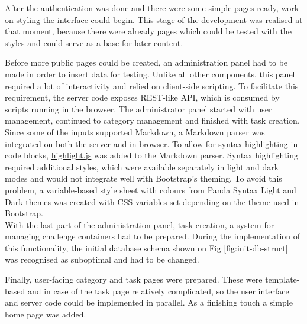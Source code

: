 After the authentication was done and there were some simple pages ready, work on styling the interface could begin. This stage of the development was realised at that moment, because there were already pages which could be tested with the styles and could serve as a base for later content.

Before more public pages could be created, an administration panel had to be made in order to insert data for testing. Unlike all other components, this panel required a lot of interactivity and relied on client-side scripting. To facilitate this requirement, the server code exposes REST-like API, which is consumed by scripts running in the browser. The administrator panel started with user management, continued to category management and finished with task creation.\\
Since some of the inputs supported Markdown, a Markdown parser was integrated on both the server and in browser. To allow for syntax highlighting in code blocks, \href{https://highlightjs.org}{highlight.js} was added to the Markdown parser. Syntax highlighting required additional styles, which were available separately in light and dark modes and would not integrate well with Bootstrap's theming. To avoid this problem, a variable-based style sheet with colours from Panda Syntax Light and Dark themes was created with CSS variables set depending on the theme used in Bootstrap.\\
With the last part of the administration panel, task creation, a system for managing challenge containers had to be prepared. During the implementation of this functionality, the initial database schema shown on Fig \ref{fig:init-db-struct} was recognised as suboptimal and had to be changed.

Finally, user-facing category and task pages were prepared. These were template-based and in case of the task page relatively complicated, so the user interface and server code could be implemented in parallel. As a finishing touch a simple home page was added.

